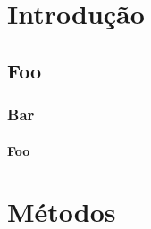 \documentclass[tcc]{../classe_uftex/uftex}
\begin{document}
  \begin{abstract}
  \lipsum[1]
  \end{abstract}

  \begin{foreignabstract}
  \lipsum[9]
  \end{foreignabstract}
  \printlosymbols  
  \printloabbreviations
  \listoffigures
  \listoftables 
  \tableofcontents %
\mainmatter
\onehalfspacing
\chapter{Introdução}

\lipsum[1] \cite{JW82}  

\lipsum[2] \cite{MenaChalco08} 

\lipsum[3] \cite{alves03:simi}

\section{Foo}

\subsection{Bar}

 \lipsum[4]

\subsubsection{Foo}

\lipsum[5] \cite{bronevetsky02}

\lipsum[6] \cite{garcia01:PhD}

\lipsum[7] \cite{schmidt03:MSc}

\lipsum[8] \cite{alvisi99:analysisCIC}

\chapter{Métodos}
\end{document}
